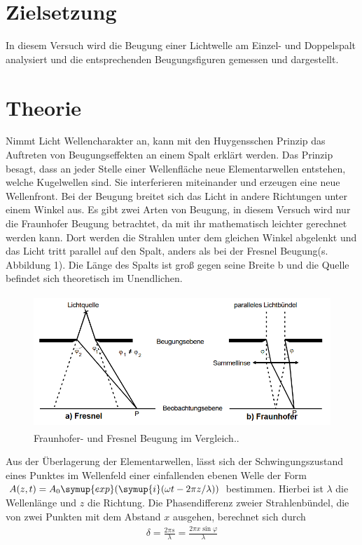 \section{Zielsetzung}
\label{sec:Zielsetzung}
In diesem Versuch wird die Beugung einer Lichtwelle am Einzel- und Doppelspalt analysiert und die entsprechenden Beugungsfiguren gemessen und dargestellt.

\section{Theorie}
\label{sec:Theorie}
Nimmt Licht Wellencharakter an, kann mit den Huygensschen Prinzip das Auftreten von Beugungseffekten an einem Spalt erklärt werden.
Das Prinzip besagt, dass an jeder Stelle einer Wellenfläche neue Elementarwellen entstehen, welche Kugelwellen sind. Sie interferieren miteinander und erzeugen eine neue Wellenfront. 
Bei der Beugung breitet sich das Licht in andere Richtungen unter einem Winkel aus. Es gibt zwei Arten von Beugung, in diesem Versuch wird nur die Fraunhofer Beugung betrachtet, da mit ihr mathematisch leichter gerechnet werden kann. 
Dort werden die Strahlen unter dem gleichen Winkel abgelenkt und das Licht tritt parallel auf den Spalt, anders als bei der Fresnel Beugung(s. Abbildung 1).
Die Länge des Spalts ist groß gegen seine Breite b und die Quelle befindet sich theoretisch im Unendlichen.
\begin{figure}[H]
  \centering
  \includegraphics[height=5cm]{naherung.PNG}
  \caption{Fraunhofer- und Fresnel Beugung im Vergleich.\cite{kent}.}
\end{figure}
\noindent Aus der Überlagerung der Elementarwellen, lässt sich der Schwingungszustand eines Punktes im Wellenfeld einer einfallenden ebenen Welle der Form $A(z, t) = A_0 \symup{exp}(\symup{i}(\omega t -2\pi z/\lambda))$ 
bestimmen. Hierbei ist $\lambda$  die Wellenlänge und $z$ die Richtung.
Die Phasendifferenz zweier Strahlenbündel, die von zwei Punkten mit dem Abstand $x$ ausgehen, berechnet sich durch
\begin{align}
  \delta = \frac{2\pi s}{\lambda} = \frac{2\pi x \sin{\varphi}}{\lambda}
\end{align}
